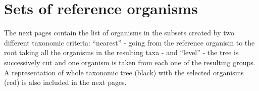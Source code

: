 \chapter{Sets of reference organisms}
\label{appendixdorota}
The next pages contain the list of organisms in the subsets created by two different taxonomic criteria: ``nearest'' - going from the reference organism to the root taking all the organisms in the resulting taxa - and ``level'' - the tree is successively cut and one organism is taken from each one of the resulting groups. A representation of whole taxonomic tree (black) with the selected organisms (red) is also included in the next pages.




